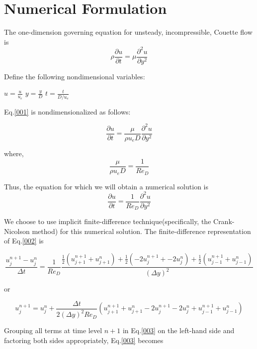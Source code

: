 
\section{Numerical Formulation}
The one-dimension governing equation for unsteady, incompressible, Couette flow is
\begin{equation}
\rho\frac{\partial u}{\partial t} = \mu\frac{\partial^2 u }{\partial y^2} \label{001}
\end{equation}

Define the following nondimensional variables:

$u=\frac{u}{u_e}$  $y=\frac{y}{D}$ $t=\frac{t}{D/u_e}$

Eq.\eqref{001} is nondimensionalized as follows:

\begin{equation}
\frac{\partial u}{\partial t} = \frac{\mu}{\rho u_e D} \frac{\partial^2 u}{\partial y^2}
\end{equation}

where,
\begin{equation}
\frac{\mu}{\rho u_e D}=\frac{1}{Re_D}
\end{equation}

Thus, the equation for which we will obtain a numerical solution is
\begin{equation}
\frac{\partial u}{\partial t}=\frac{1}{Re_D}\frac{\partial^2 u}{\partial y^2} \label{002}
\end{equation}

We choose to use implicit finite-difference technique(specifically, the Crank-Nicolson method) for this numerical solution.
The finite-difference representation of Eq.\eqref{002} is

\begin{equation}
\frac{u^{n+1}_j-u^n_j}{\Delta t} = \frac{1}{Re_D}\frac{\frac{1}{2}(u^{n+1}_{j+1}+u^n_{j+1})+\frac{1}{2}(-2u^{n+1}_j+-2u^n_j)+\frac{1}{2}(u^{n+1}_{j-1}+u^n_{j-1})}{(\Delta y)^2}
\end{equation}

or

\begin{equation}
u^{n+1}_j = u^n_j + \frac{\Delta t}{2(\Delta y)^2 Re_D}(u^{n+1}_{j+1}+u^n_{j+1}-2u^{n+1}_j-2u^n_j+u^{n+1}_{j-1}+u^n_{j-1}) \label{003}
\end{equation}

Grouping all terms at time level $n+1$ in Eq.\eqref{003} on the left-hand side and factoring both sides appropriately, Eq.\eqref{003} becomes

